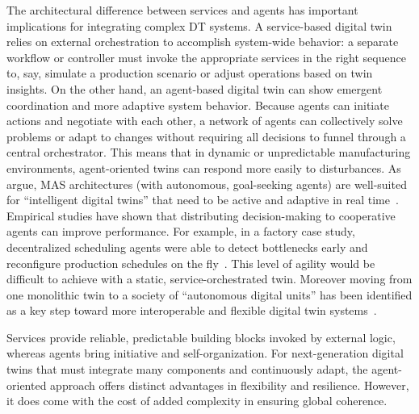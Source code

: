 The architectural difference between services and agents has important implications for integrating complex DT systems. A service-based digital twin relies on external orchestration to accomplish system-wide behavior: a separate workflow or controller must invoke the appropriate services in the right sequence to, say, simulate a production scenario or adjust operations based on twin insights. On the other hand, an agent-based digital twin can show emergent coordination and more adaptive system behavior. Because agents can initiate actions and negotiate with each other, a network of agents can collectively solve problems or adapt to changes without requiring all decisions to funnel through a central orchestrator. This means that in dynamic or unpredictable manufacturing environments, agent-oriented twins can respond more easily to disturbances. As \citeauthor{Lehmann2023} argue, MAS architectures (with autonomous, goal-seeking agents) are well-suited for “intelligent digital twins” that need to be active and adaptive in real time~\cite{Lehmann2023}. Empirical studies have shown that distributing decision-making to cooperative agents can improve performance. For example, in a factory case study, decentralized scheduling agents were able to detect bottlenecks early and reconfigure production schedules on the fly~\cite{Siatras2024}. This level of agility would be difficult to achieve with a static, service-orchestrated twin. Moreover moving from one monolithic twin to a society of “autonomous digital units” has been identified as a key step toward more interoperable and flexible digital twin systems~\cite{David2023}. 

Services provide reliable, predictable building blocks invoked by external logic, whereas agents bring initiative and self-organization. For next-generation digital twins that must integrate many components and continuously adapt, the agent-oriented approach offers distinct advantages in flexibility and resilience. However, it does come with the cost of added complexity in ensuring global coherence.

